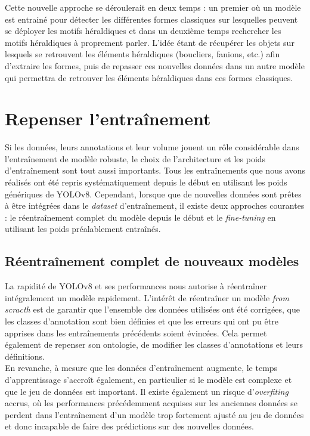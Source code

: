 \documentclass[12pt,twoside]{book}
\begin{document}
Cette nouvelle approche se déroulerait en deux temps : un premier où un modèle est entrainé pour détecter les différentes formes classiques sur lesquelles peuvent se déployer les motifs héraldiques et dans un deuxième temps rechercher les motifs héraldiques à proprement parler. L’idée étant de récupérer les objets sur lesquels se retrouvent les éléments héraldiques (boucliers, fanions, etc.) afin d’extraire les formes, puis de repasser ces nouvelles données dans un autre modèle qui permettra de retrouver les éléments héraldiques dans ces formes classiques.  \\

\newpage
\section{Repenser l'entraînement}

Si les données, leurs annotations et leur volume jouent un rôle considérable dans l’entraînement de modèle robuste, le choix de l’architecture et les poids d’entraînement sont tout aussi importants. Tous les entraînements que nous avons réalisés ont été repris systématiquement depuis le début en utilisant les poids génériques de YOLOv8. Cependant, lorsque que de nouvelles données sont prêtes à être intégrées dans le \textit{dataset} d'entraînement, il existe deux approches courantes : le réentraînement complet du modèle depuis le début et le \textit{fine-tuning} en utilisant les poids préalablement entraînés.

\subsection{Réentraînement complet de nouveaux modèles}

La rapidité de YOLOv8 et ses performances nous autorise à réentraîner intégralement un modèle rapidement. L’intérêt de réentraîner un modèle \textit{from scracth} est de garantir que l’ensemble des données utilisées ont été corrigées, que les classes d’annotation sont bien définies et que les erreurs qui ont pu être apprises dans les entraînements précédents soient évincées. Cela permet également de repenser son ontologie, de modifier les classes d’annotations et leurs définitions. \\

En revanche, à mesure que les données d’entraînement augmente, le temps d’apprentissage s’accroît également, en particulier si le modèle est complexe et que le jeu de données est important. Il existe également un risque d'\textit{overfiting} accrus, où les performances précédemment acquises sur les anciennes données se perdent dans l’entraînement d’un modèle trop fortement ajusté au jeu de données et donc incapable de faire des prédictions sur des nouvelles données. 
\end{document}

